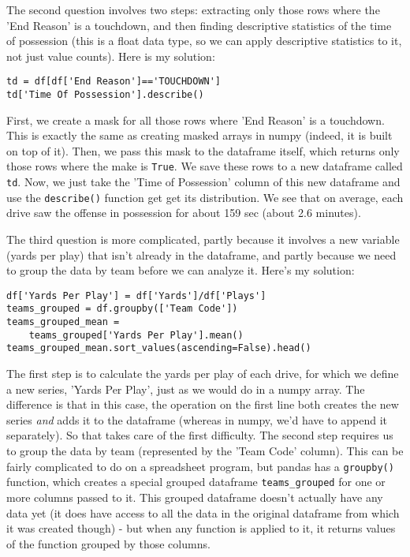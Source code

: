 \documentclass[12pt]{article}
\newcommand{\code}{\texttt}
\begin{document}
The second question involves two steps: extracting only those rows where the 'End Reason' is a touchdown, and then finding descriptive statistics of the time of possession (this is a float data type, so we can apply descriptive statistics to it, not just value counts). Here is my solution:

\begin{lstlisting}[frame=single] 
td = df[df['End Reason']=='TOUCHDOWN']
td['Time Of Possession'].describe()
\end{lstlisting}

First, we create a mask for all those rows where 'End Reason' is a touchdown. This is exactly the same as creating masked arrays in numpy (indeed, it is built on top of it). Then, we pass this mask to the dataframe itself, which returns only those rows where the make is \code{True}. We save these rows to a new dataframe called \code{td}. Now, we just take the 'Time of Possession' column of this new dataframe and use the \code{describe()} function get get its distribution. We see that on average, each drive saw the offense in possession for about 159 sec (about 2.6 minutes). 

The third question is more complicated, partly because it involves a new variable (yards per play) that isn't already in the dataframe, and partly because we need to group the data by team before we can analyze it. Here's my solution:

\begin{lstlisting}[frame=single] 
df['Yards Per Play'] = df['Yards']/df['Plays']
teams_grouped = df.groupby(['Team Code'])
teams_grouped_mean = 
	teams_grouped['Yards Per Play'].mean()
teams_grouped_mean.sort_values(ascending=False).head()
\end{lstlisting}

The first step is to calculate the yards per play of each drive, for which we define a new series, 'Yards Per Play', just as we would do in a numpy array. The difference is that in this case, the operation on the first line both creates the new series \textit{and} adds it to the dataframe (whereas in numpy, we'd have to append it separately). So that takes care of the first difficulty. The second step requires us to group the data by team (represented by the 'Team Code' column). This can be fairly complicated to do on a spreadsheet program, but pandas has a \code{groupby()} function, which creates a special grouped dataframe \code{teams\_grouped} for one or more columns passed to it. This grouped dataframe doesn't actually have any data yet (it does have access to all the data in the original dataframe from which it was created though) - but when any function is applied to it, it returns values of the function grouped by those columns.
\end{document}
